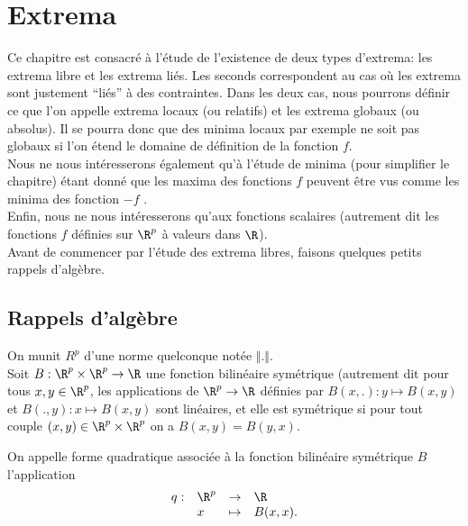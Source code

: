 \documentclass[class=report,crop=false]{standalone}
\begin{document}
\chapter{Extrema}\label{extrema}

Ce chapitre est consacré à l'étude de l'existence de deux types d'extrema: les extrema libre et les extrema liés. Les seconds correspondent au cas où les extrema sont justement ``liés'' à des contraintes. Dans les deux cas, nous pourrons définir ce que l'on appelle extrema locaux (ou relatifs) et les extrema globaux (ou absolus). Il se pourra donc que des minima locaux par exemple ne soit pas globaux si l'on étend
le domaine de définition de la fonction $f$. \\
Nous ne nous intéresserons également qu'à l'étude de minima (pour simplifier le chapitre) étant donné que  les maxima des fonctions $f$ peuvent être vus comme les minima des fonction $-f$ .\\
Enfin, nous ne nous intéresserons qu'aux fonctions scalaires (autrement dit les fonctions $f$ définies sur $\R^p$ à valeurs dans $\R$).\\
$ $\\
Avant de commencer par l'étude des extrema libres, faisons quelques petits rappels d'algèbre.

\section{Rappels d'algèbre}

\noindent On munit $R^p$ d'une norme quelconque notée $\Vert . \Vert$. \\
Soit $B: \R^p \times \R^p \rightarrow \R$ une fonction bilinéaire symétrique (autrement dit pour tous $x,y \in \R^p$, les applications 
de $\R^p \rightarrow \R$ définies par $B(x,.): y \mapsto B(x,y)$ et    $B(.,y): x \mapsto B(x,y)$ sont linéaires, et elle est symétrique si pour tout couple $(x,y) \in \R^p \times \R^p$ on a $B(x,y)=B(y,x)$. \\






\begin{definition}
\textcolor[rgb]{0.98,0.00,0.00}{
On appelle forme quadratique associée à la fonction bilinéaire symétrique $B$ l'application 
\begin{equation*}
\begin{array}{llll}
q: &\R^p &\rightarrow & \R \\
    & x     & \mapsto     & B(x,x).
\end{array}
\end{equation*}
}
\end{definition}
\end{document}

